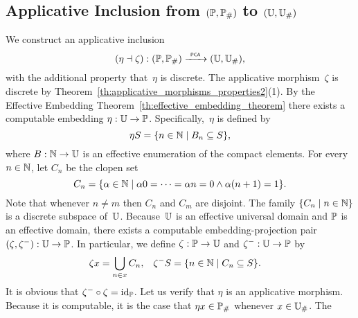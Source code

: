 
\subsection{Applicative Inclusion from $(\Scott, \comp{\Scott})$ to $(\UU,
  \comp{\UU})$}
\label{sec:app_mor_PP_UU}%

%
%

We construct an applicative inclusion
\begin{equation*}
  (\eta \dashv \zeta): (\Scott, \comp{\Scott}) \pcato (\UU, \comp{\UU}),
\end{equation*}
with the additional property that~$\eta$ is discrete. The applicative
morphism~$\zeta$ is discrete by
Theorem~\ref{th:applicative_morphisms_properties2}(1). By the Effective
Embedding Theorem~\ref{th:effective_embedding_theorem} there exists a
computable embedding $\eta: \UU \to \Scott$. Specifically,~$\eta$ is
defined by
%
\begin{equation*}
  \eta S = \set{ n \in \NN \such B_n \subseteq S },
\end{equation*}
%
where $B : \NN \to \UU$ is an effective enumeration of the compact elements. For every $n \in \NN$, let $C_n$ be the clopen set
%
\begin{equation*}
  C_n = \set{ \alpha \in \NN \such
    \alpha 0 = \cdots = \alpha n = 0 \land \alpha (n+1) = 1
    }.
\end{equation*}
%
Note that whenever $n \neq m$ then $C_n$ and $C_m$ are disjoint. The
family $\set{C_n \such n \in \NN}$ is a discrete subspace of~$\UU$.
Because~$\UU$ is an effective universal domain and $\Scott$ is an
effective domain, there exists a computable embedding-projection pair
$(\zeta, \zeta^{-}): \UU \to \Scott$. In particular, we define
$\zeta: \Scott \to \UU$ and $\zeta^{-}: \UU \to \Scott$ by
%
\begin{align*}
  \zeta x &= \bigcup_{n \in x} C_n,
  &
  \zeta^{-} S &= \set{n \in \NN \such C_n \subseteq S}.
\end{align*}
%
It is obvious that $\zeta^{-} \circ \zeta = \id[\Scott]$. Let us verify
that $\eta$ is an applicative morphism. Because it is computable, it
is the case that $\eta x \in \comp{\Scott}$ whenever $x \in \comp{\UU}$. The
